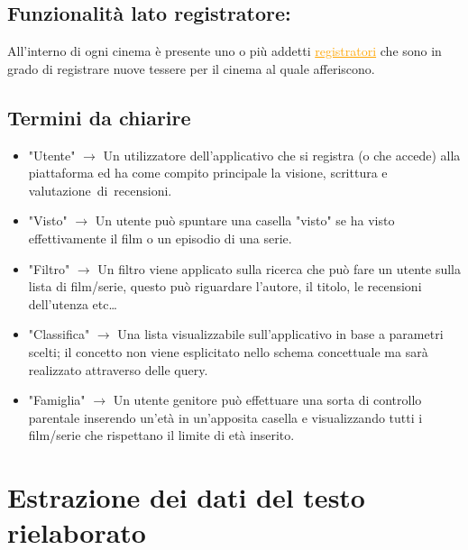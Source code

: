 \documentclass[a4paper,12pt]{report}
\begin{document}
	\subsection{Funzionalità lato registratore:}
	All'interno di ogni cinema è presente uno o più addetti \textcolor{orange}{\underline{registratori}} che sono in grado di registrare nuove tessere per il cinema al quale afferiscono.
	
	\subsection{Termini da chiarire}\label{ss:terminologia}
	\begin{itemize}
		\item "Utente" $\longrightarrow$ Un utilizzatore dell'applicativo che si registra (o che accede) alla piattaforma ed ha come compito principale la visione, scrittura e valutazione di recensioni.
		\item "Visto" $\longrightarrow$ Un utente può spuntare una casella "visto" se ha visto effettivamente il film o un episodio di una serie.
		\item "Filtro" $\longrightarrow$ Un filtro viene applicato sulla ricerca che può fare un utente sulla lista di film/serie, questo può riguardare l'autore, il titolo, le recensioni dell'utenza etc\dots
		\item "Classifica" $\longrightarrow$ Una lista visualizzabile sull'applicativo in base a parametri scelti; il concetto non viene esplicitato nello schema concettuale ma sarà realizzato attraverso delle query.
		\item "Famiglia" $\longrightarrow$ Un utente genitore può effettuare una sorta di controllo parentale inserendo un'età in un'apposita casella e visualizzando tutti i film/serie che rispettano il limite di età inserito.
	\end{itemize}
	\section{Estrazione dei dati del testo rielaborato}
\end{document}
